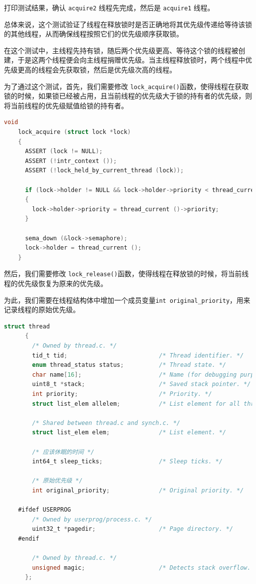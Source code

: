 \documentclass{article}
\begin{document}
打印测试结果，确认 \texttt{acquire2} 线程先完成，然后是 \texttt{acquire1} 线程。

总体来说，这个测试验证了线程在释放锁时是否正确地将其优先级传递给等待该锁的其他线程，从而确保线程按照它们的优先级顺序获取锁。

在这个测试中，主线程先持有锁，随后两个优先级更高、等待这个锁的线程被创建，于是这两个线程便会向主线程捐赠优先级。当主线程释放锁时，两个线程中优先级更高的线程会先获取锁，然后是优先级次高的线程。

为了通过这个测试，首先，我们需要修改 \texttt{lock\_acquire()}函数，使得线程在获取锁的时候，如果锁已经被占用，且当前线程的优先级大于锁的持有者的优先级，则将当前线程的优先级赋值给锁的持有者。

\begin{lstlisting}[language=C, title=修改后的\texttt{lock\_acquire()}函数]
    void
    lock_acquire (struct lock *lock)
    {
      ASSERT (lock != NULL);
      ASSERT (!intr_context ());
      ASSERT (!lock_held_by_current_thread (lock));
    
      if (lock->holder != NULL && lock->holder->priority < thread_current ()->priority)
      {
        lock->holder->priority = thread_current ()->priority;
      }
    
      sema_down (&lock->semaphore);
      lock->holder = thread_current ();
    }

\end{lstlisting}

然后，我们需要修改 \texttt{lock\_release()}函数，使得线程在释放锁的时候，将当前线程的优先级恢复为原来的优先级。

为此，我们需要在线程结构体中增加一个成员变量\texttt{int original\_priority}，用来记录线程的原始优先级。

\begin{lstlisting}[language=C, title=修改后的线程结构体]
    struct thread
      {
        /* Owned by thread.c. */
        tid_t tid;                          /* Thread identifier. */
        enum thread_status status;          /* Thread state. */
        char name[16];                      /* Name (for debugging purposes). */
        uint8_t *stack;                     /* Saved stack pointer. */
        int priority;                       /* Priority. */
        struct list_elem allelem;           /* List element for all threads list. */
    
        /* Shared between thread.c and synch.c. */
        struct list_elem elem;              /* List element. */
    
        /* 应该休眠的时间 */
        int64_t sleep_ticks;                /* Sleep ticks. */
    
        /* 原始优先级 */
        int original_priority;              /* Original priority. */
    
    #ifdef USERPROG
        /* Owned by userprog/process.c. */
        uint32_t *pagedir;                  /* Page directory. */
    #endif
    
        /* Owned by thread.c. */
        unsigned magic;                     /* Detects stack overflow. */
      };

\end{lstlisting}
\end{document}
